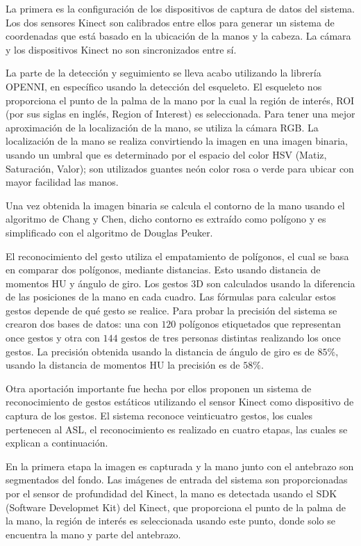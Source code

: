 La primera es la configuración de los dispositivos de captura de datos del sistema. Los dos sensores Kinect son calibrados entre ellos para generar un sistema de coordenadas que está basado en la ubicación de la  manos y la cabeza. La cámara y los dispositivos Kinect no son sincronizados entre sí.  

La parte de la detección y seguimiento  se lleva acabo utilizando la librería OPENNI, en específico usando la detección del esqueleto. El esqueleto nos proporciona el punto de la palma de la mano por la cual la región de interés, ROI (por sus siglas en inglés, Region of Interest) es seleccionada. Para tener una  mejor aproximación de la localización de la mano, se utiliza la cámara RGB. La localización de la mano se realiza convirtiendo la imagen en una imagen binaria, usando un umbral que es determinado por el espacio del color HSV (Matiz, Saturación, Valor); son utilizados guantes neón color rosa o verde para ubicar con mayor facilidad las manos.   

Una vez obtenida la imagen binaria se calcula el contorno de la mano usando el algoritmo de Chang y Chen, dicho contorno es extraído como polígono y  es simplificado con el algoritmo de Douglas Peuker. 

El reconocimiento del gesto utiliza el empatamiento de polígonos, el cual se basa en comparar dos polígonos, mediante distancias. Esto usando distancia de momentos HU y ángulo de giro. 
Los gestos 3D son calculados usando la diferencia de las posiciones de la mano en cada cuadro. Las fórmulas para calcular estos gestos depende de qué gesto se  realice.  
Para probar la precisión del sistema se crearon dos bases de datos: una con $120$ polígonos etiquetados que representan once gestos y otra con $144$ gestos de tres personas distintas realizando los once gestos. La precisión obtenida usando la distancia de ángulo de giro es de $85 \%$, usando la distancia de momentos HU la precisión es de $58 \%$.  


Otra aportación importante fue hecha por \citep{Kang2013} ellos proponen un sistema de reconocimiento de  gestos estáticos utilizando el sensor Kinect como dispositivo de captura de los gestos. El sistema reconoce veinticuatro gestos, los cuales pertenecen al ASL, el reconocimiento es realizado en cuatro etapas, las cuales se explican a continuación.  

En la primera etapa la imagen es capturada y la mano junto con el antebrazo son segmentados del fondo. Las imágenes de entrada del sistema son proporcionadas por el sensor de profundidad del Kinect, la mano es detectada usando el SDK (Software Developmet Kit) del Kinect, que proporciona el punto de la palma de la mano, la región de interés es seleccionada usando este punto, donde  solo se encuentra la mano y parte del antebrazo.   

